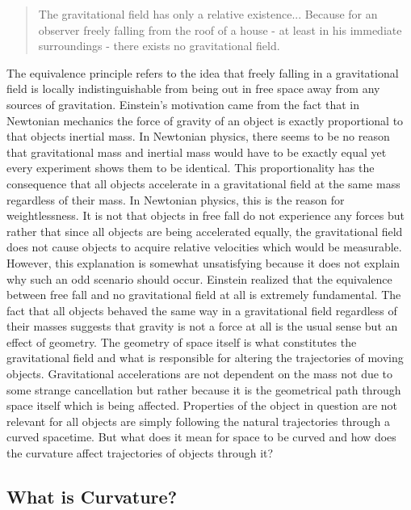\documentclass[11pt, a4paper]{article}
\begin{document}
\begin{quote}
The gravitational field has only a relative existence... Because for an observer freely falling from the roof of a house - at least in his immediate surroundings - there exists no gravitational field.
\end{quote}
The equivalence principle refers to the idea that freely falling in a gravitational field is locally indistinguishable from being out in free space away from any sources of gravitation. Einstein's motivation came from the fact that in Newtonian mechanics the force of gravity of an object is exactly proportional to that objects inertial mass. In Newtonian physics, there seems to be no reason that gravitational mass and inertial mass would have to be exactly equal yet every experiment shows them to be identical. This proportionality has the consequence that all objects accelerate in a gravitational field at the same mass regardless of their mass. In Newtonian physics, this is the reason for weightlessness. It is not that objects in free fall do not experience any forces but rather that since all objects are being accelerated equally, the gravitational field does not cause objects to acquire relative velocities which would be measurable. However, this explanation is somewhat unsatisfying because it does not explain why such an odd scenario should occur. Einstein realized that the equivalence between free fall and no gravitational field at all is extremely fundamental. The fact that all objects behaved the same way in a gravitational field regardless of their masses suggests that gravity is not a force at all is the usual sense but an effect of geometry. The geometry of space itself is what constitutes the gravitational field and what is responsible for altering the trajectories of moving objects. Gravitational accelerations are not dependent on the mass not due to some strange cancellation but rather because it is the geometrical path through space itself which is being affected. Properties of the object in question are not relevant for all objects are simply following the natural trajectories through a curved spacetime. But what does it mean for space to be curved and how does the curvature affect trajectories of objects through it?

\subsection{What is Curvature?}
\end{document}
